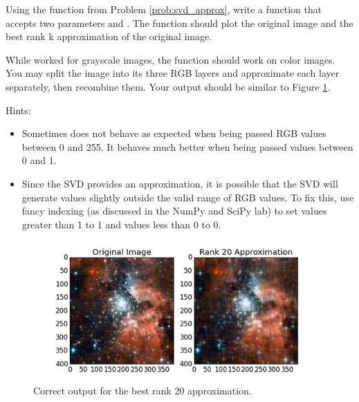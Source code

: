 \begin{problem}
Using the  function from Problem \ref{prob:svd_approx}, write a function  that accepts two parameters  and . The function should plot the original image and the best rank k approximation of the original image. 

While  worked for grayscale images, the  function should work on color images. 
You may split the image into its three RGB layers and approximate each layer separately, then recombine them.
Your output should be similar to Figure \ref{fig:compressed_image}.

Hints:
\begin{itemize}
\item Sometimes  does not behave as expected when being passed RGB values between 0 and 255. It behaves much better when being passed values between 0 and 1. 
\item Since the SVD provides an approximation, it is possible that the SVD will generate values slightly outside the valid range of RGB values. 
To fix this, use fancy indexing (as discussed in the NumPy and SciPy lab) to set values greater than 1 to 1 and values less than 0 to 0. 
\end{itemize}

\begin{figure}[H]
\includegraphics[width=\textwidth]{compressed.jpg}
\caption{Correct output for the best rank 20 approximation.}
\label{fig:compressed_image}
\end{figure}
\end{problem}
